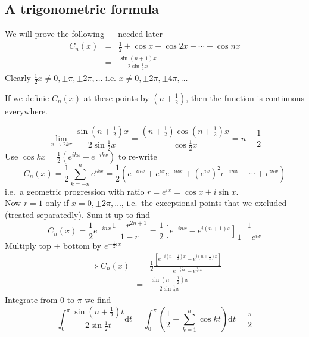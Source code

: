\documentclass[12pt]{report}
\theoremstyle{definition}
\begin{document}
\subsection{A trigonometric formula}
We will prove the following --- needed later
\begin{eqnarray*}
    C_n(x) &=& \frac{1}{2} + \cos{x} + \cos{2x} + \cdots + \cos{nx} \\
           &=& \frac{\sin{(n+1)x}}{2\sin{\frac{1}{2}x}}
\end{eqnarray*}
Clearly $\frac{1}{2}x \neq 0,\pm\pi,\pm 2\pi,\ldots$ i.e. $x \neq 0,\pm 2\pi, \pm 4\pi, \ldots$
\smallskip
\\
\begin{minipage}{\linewidth}
If we definie $C_n(x)$ at these points by $(n+\frac{1}{2})$, then the function is continuous everywhere.
\end{minipage}
\[
    \lim_{x \rightarrow 2k\pi} \frac{\sin{(n+\frac{1}{2})x}}{2\sin{\frac{1}{2}x}}
    = \frac{\left(n+\frac{1}{2}\right) \cos{(n+\frac{1}{2})x}}{\cos{\frac{1}{2}x}}
    = n + \frac{1}{2}
\]
Use $\cos{kx} = \frac{1}{2} (e^{ikx} + e^{-ikx})$ to re-write\[
    C_n(x) = \frac{1}{2} \sum_{k=-n}^{n} e^{ikx} 
    = \frac{1}{2}(e^{-inx} + e^{ix}e^{-inx} + {\left(e^{ix}\right)}^{2}e^{-inx} + \cdots + e^{inx})
\]
i.e.\ a geometric progression with ratio $r = e^{ix} = \cos{x} + i\sin{x}$.
\smallskip
\\Now $r = 1$ only if $x = 0,\pm 2\pi, \ldots$, i.e.\ the exceptional points that we excluded (treated separatedly).
Sum it up to find \[
    C_n(x) = \frac{1}{2}e^{-inx}\frac{1 - r^{2n+1}}{1 - r}
    = \frac{1}{2} \left[e^{-inx} - e^{i(n+1)x}\right] \frac{1}{1 - e^{ix}}
\]
Multiply top + bottom by $e^{-\frac{1}{2}ix}$
\begin{eqnarray*}
    \Rightarrow C_n(x) &=& \frac{1}{2}
    \frac{[e^{-i(n+\frac{1}{2})x} - e^{i(n+\frac{1}{2})x}]}{e^{-\frac{1}{2}ix} - e^{\frac{1}{2}ix}} \\
                       &=& \frac{\sin{(n+\frac{1}{2})x}}{2\sin{\frac{1}{2}x}}
\end{eqnarray*}
Integrate from 0 to $\pi$ we find\[
    \int_{0}^{\pi} \frac{\sin(n+\frac{1}{2})t}{2\sin{\frac{1}{2}t}} \mathrm{d}t
    = \int_{0}^{\pi} \left(\frac{1}{2} + \sum_{k=1}^{n} \cos{kt}\right) \mathrm{d}t
    = \frac{\pi}{2}
\]
\end{document}
